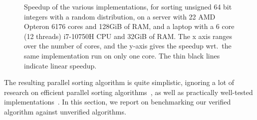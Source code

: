 \documentclass[runningheads]{llncs}
\begin{document}
  \begin{figure}


  \caption{Speedup of the various implementations, for sorting unsigned 64 bit integers with a random distribution, on
    a server with 22 AMD Opteron 6176 cores and 128GiB of RAM, and a laptop with a
    6 core (12 threads) i7-10750H CPU and 32GiB of RAM.
    The x axis ranges over the number of cores, and the y-axis gives the speedup wrt.\ the same implementation run on only one core.
    The thin black lines indicate linear speedup.
  }\label{fig:speedup}

  \end{figure}


  The resulting parallel sorting algorithm is quite simplistic,
  ignoring a lot of research on efficient parallel sorting algorithms~\cite{CNLM08},
  as well as practically well-tested implementations~\cite{boost-sort}.
  In this section, we report on benchmarking our verified algorithm against unverified algorithms.
\end{document}
